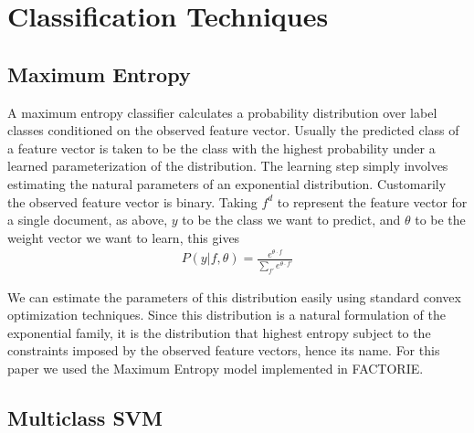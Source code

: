 \section{Classification Techniques}

\subsection{Maximum Entropy} %
\label{sub:maximum_entropy}
A maximum entropy classifier calculates a probability distribution over label classes conditioned on the observed feature vector. Usually the predicted class of a feature vector is taken to be the class with the highest probability under a learned parameterization of the distribution. The learning step simply involves estimating the natural parameters of an exponential distribution. Customarily the observed feature vector is binary. Taking $f^d$ to represent the feature vector for a single document, as above, $y$ to be the class we want to predict, and $\theta$ to be the weight vector we want to learn, this gives
\begin{align*}
	P(y|f, \theta) = \frac{e^{\theta \cdot f}}{\sum_{f'} e^{\theta \cdot f'}}
\end{align*}

We can estimate the parameters of this distribution easily using standard convex optimization techniques. Since this distribution is a natural formulation of the exponential family, it is the distribution that highest entropy subject to the constraints imposed by the observed feature vectors, hence its name. For this paper we used the Maximum Entropy model implemented in FACTORIE.


\subsection{Multiclass SVM} %
\label{sub:multiclass_svm}





